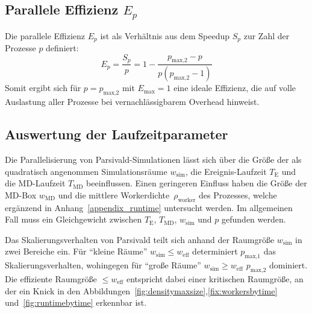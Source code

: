 \subsection{Parallele Effizienz $E_p$}

Die parallele Effizienz $E_p$ ist als Verhältnis aus dem Speedup $S_p$ zur Zahl der Prozesse $p$ definiert:
\begin{equation}
  E_p = \frac{S_p}{p} = 1 - \frac{p_\text{max,2} - p}{p (p_\text{max,2} - 1)}
\end{equation}
Somit ergibt sich für $p = p_\text{max,2}$ mit $E_\text{max} = 1$ eine ideale Effizienz, die auf volle Auslastung aller Prozesse bei vernachlässigbarem Overhead hinweist.



\subsection{Auswertung der Laufzeitparameter}

Die Parallelisierung von Parsivald-Simulationen lässt sich über die Größe der als quadratisch angenommen Simulationsräume $w_\text{sim}$, die Ereignis-Laufzeit $T_\text{E}$ und die MD-Laufzeit $T_\text{MD}$ beeinflussen.
Einen geringeren Einfluss haben die Größe der MD-Box $w_\text{MD}$ und die mittlere Workerdichte~$\rho_\text{worker}$ des Prozesses, welche ergänzend in Anhang~\ref{appendix_runtime} untersucht werden.
Im allgemeinen Fall muss ein Gleichgewicht zwischen $T_\text{E}$, $T_\text{MD}$, $w_\text{sim}$ und $p$ gefunden werden.

Das Skalierungsverhalten von Parsivald teilt sich anhand der Raumgröße $w_\text{sim}$ in zwei Bereiche ein.
Für ``kleine Räume'' $w_\text{sim} \le w_\text{eff}$ determiniert $p_\text{max,1}$ das Skalierungsverhalten, wohingegen für ``große Räume'' $w_\text{sim} \ge w_\text{eff}$ $p_\text{max,2}$ dominiert.
Die effiziente Raumgröße $\le w_\text{eff}$ entspricht dabei einer kritischen Raumgröße, an der ein Knick in den Abbildungen~\ref{fig:densitymaxsize},\ref{fix:workersbytime} und~\ref{fig:runtimebytime} erkennbar ist.

